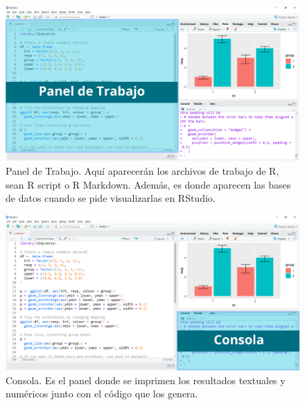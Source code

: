 \documentclass[
]{article}
\theoremstyle{definition}
\theoremstyle{definition}
\theoremstyle{definition}
\theoremstyle{definition}
\theoremstyle{remark}
\begin{document}
\begin{figure}

{\centering \includegraphics[width=1\linewidth]{figs/screenshots/Slide1} 

}

\caption{Panel de Trabajo. Aquí aparecerán los archivos de trabajo de R, sean R script o R Markdown. Además, es donde aparecen las bases de datos cuando se pide visualizarlas en RStudio.}\label{fig:figura14}
\end{figure}



\begin{figure}

{\centering \includegraphics[width=1\linewidth]{figs/screenshots/Slide2} 

}

\caption{Consola. Es el panel donde se imprimen los resultados textuales y numéricos junto con el código que los genera.}\label{fig:figura15}
\end{figure}
\end{document}
